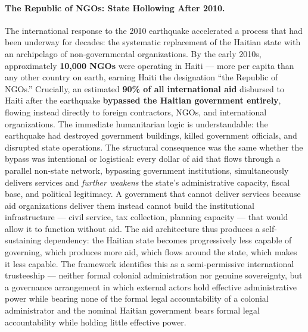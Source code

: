 \paragraph{The Republic of NGOs: State Hollowing After 2010.}
The international response to the 2010 earthquake accelerated a process that had been underway for decades: the systematic replacement of the Haitian state with an archipelago of non-governmental organizations. By the early 2010s, approximately \textbf{10,000 NGOs} were operating in Haiti --- more per capita than any other country on earth, earning Haiti the designation ``the Republic of NGOs.'' Crucially, an estimated \textbf{90\% of all international aid} disbursed to Haiti after the earthquake \textbf{bypassed the Haitian government entirely}, flowing instead directly to foreign contractors, NGOs, and international organizations. The immediate humanitarian logic is understandable: the earthquake had destroyed government buildings, killed government officials, and disrupted state operations. The structural consequence was the same whether the bypass was intentional or logistical: every dollar of aid that flows through a parallel non-state network, bypassing government institutions, simultaneously delivers services and \textit{further weakens} the state's administrative capacity, fiscal base, and political legitimacy. A government that cannot deliver services because aid organizations deliver them instead cannot build the institutional infrastructure --- civil service, tax collection, planning capacity --- that would allow it to function without aid. The aid architecture thus produces a self-sustaining dependency: the Haitian state becomes progressively less capable of governing, which produces more aid, which flows around the state, which makes it less capable. The framework identifies this as a semi-permissive international trusteeship --- neither formal colonial administration nor genuine sovereignty, but a governance arrangement in which external actors hold effective administrative power while bearing none of the formal legal accountability of a colonial administrator and the nominal Haitian government bears formal legal accountability while holding little effective power.

